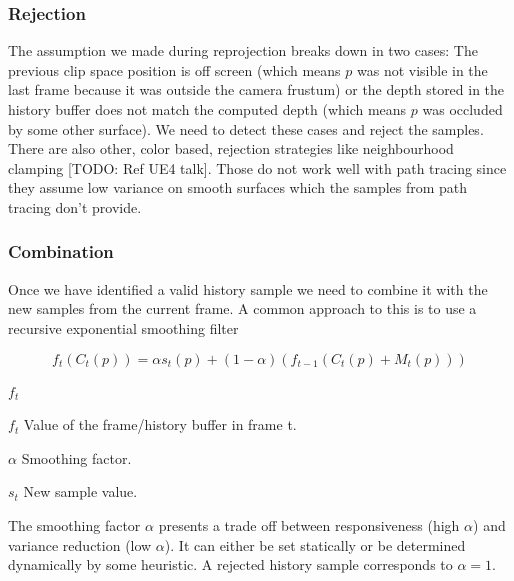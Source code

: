 \documentclass{ACGSeminar}
\begin{document}
\subsubsection{Rejection}
The assumption we made during reprojection breaks down in two cases: The previous clip space position is off screen (which means $p$ was not visible in the last frame because it was outside the camera frustum) or the depth stored in the history buffer does not match the computed depth (which means $p$ was occluded by some other surface). We need to detect these cases and reject the samples. There are also other, color based, rejection strategies like neighbourhood clamping [TODO: Ref UE4 talk]. Those do not work well with path tracing since they assume low variance on smooth surfaces which the samples from path tracing don't provide.

\subsubsection{Combination}
Once we have identified a valid history sample we need to combine it with the new samples from the current frame. A common approach to this is to use a recursive exponential smoothing filter \cite{Yang:2009} 

\begin{equation}
f_t(C_{t}(p)) = \alpha s_t(p) + (1-\alpha)(f_{t-1}(C_{t}(p) + M_t(p)))
\end{equation}
\begin{labeling}{$f_t$}
\item [$f_t$] Value of the frame/history buffer in frame t.
\item [$\alpha$] Smoothing factor.
\item [$s_t$] New sample value.
\end{labeling}

The smoothing factor $\alpha$ presents a trade off between responsiveness (high $\alpha$) and variance reduction (low $\alpha$). It can either be set statically or be determined dynamically by some heuristic. A rejected history sample corresponds to $\alpha = 1$. 
\end{document}

